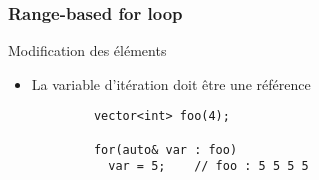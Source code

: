 \documentclass[C++.tex]{subfiles}
\begin{document}
\begin{frame}[fragile]
	\frametitle{Range-based for loop}
	\begin{alertblock}{Modification des éléments}
		\begin{itemize}
			\item La variable d'itération doit être une référence
		\end{itemize}

		\begin{verbatim}
			vector<int> foo(4);

			for(auto& var : foo)
			  var = 5;    // foo : 5 5 5 5
  		\end{verbatim}
	\end{alertblock}

\end{frame}
\end{document}
